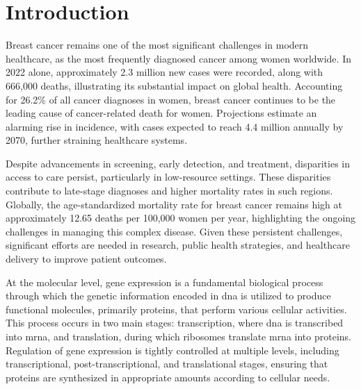 \chapter{Introduction}

Breast cancer remains one of the most significant challenges in modern
healthcare, as the most frequently diagnosed cancer among women worldwide.
In 2022 alone, approximately 2.3 million new cases were recorded, along with
666,000 deaths, illustrating its substantial impact on global health.
Accounting for 26.2\% of all cancer diagnoses in
women\supercite{bray_global_2024,ferlay_global_2024}, breast cancer continues
to be the leading cause of cancer-related death for women.
Projections estimate an alarming rise in incidence, with cases expected to
reach 4.4 million annually by 2070, further straining healthcare
systems\supercite{lei_global_2021}.

Despite advancements in screening, early detection, and treatment, disparities
in access to care persist, particularly in low-resource settings.
These disparities contribute to late-stage diagnoses and higher mortality rates
in such regions\supercite{wilkinson_understanding_2022,ginsburg_breast_2020}.
Globally, the age-standardized mortality rate for breast cancer remains high at
approximately 12.65 deaths per 100,000 women per year, highlighting the ongoing
challenges in managing this complex
disease\supercite{bray_global_2024,ferlay_global_2024}.
Given these persistent challenges, significant efforts are needed in research,
public health strategies, and healthcare delivery to improve patient
outcomes\supercite{desantis_breast_2019}.

At the molecular level, gene expression is a fundamental biological process
through which the genetic information encoded in \gls{dna} is utilized to produce
functional molecules, primarily proteins, that perform various cellular
activities\supercite{salmena_cerna_2011}.
This process occurs in two main stages: transcription, where \gls{dna} is transcribed
into \gls{mrna}, and translation, during which ribosomes translate \gls{mrna}
into proteins\supercite{salmena_cerna_2011,tay_multilayered_2014}.
Regulation of gene expression is tightly controlled at multiple levels,
including transcriptional, post-transcriptional, and translational stages,
ensuring that proteins are synthesized in appropriate amounts according to
cellular
needs\supercite{poliseno_coding-independent_2010,tay_multilayered_2014}.


